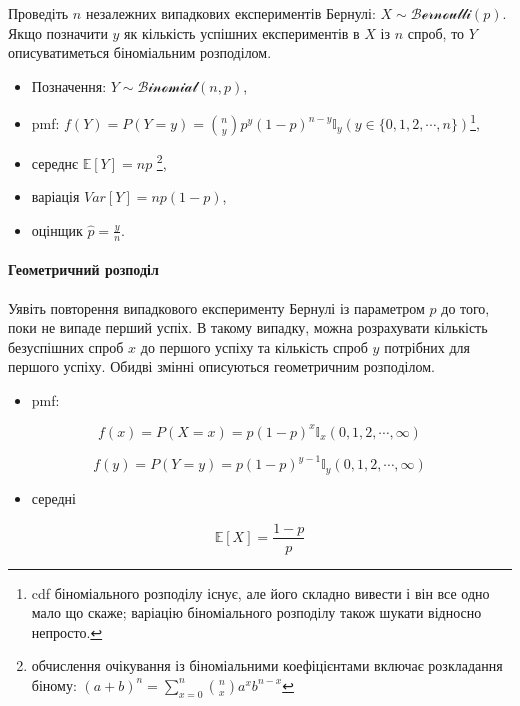 \documentclass[
  11pt,
]{book}
\providecommand{\tightlist}{%
  \setlength{\itemsep}{0pt}\setlength{\parskip}{0pt}}
\begin{document}
Проведіть \(n\) незалежних випадкових експериментів Бернулі: \(X \sim \mathcal{Bernoulli}(p)\). Якщо позначити \(y\) як кількість успішних експериментів в \(X\) із \(n\) спроб, то \(Y\) описуватиметься біноміальним розподілом.

\begin{itemize}
\item
  Позначення: \(Y \sim \mathcal{Binomial}(n, p)\),
\item
  pmf: \(f(Y) = P(Y = y) = \binom{n}{y} p^y (1-p)^{n - y} \mathbb{I}_y (y \in \{0, 1, 2, \cdots, n\})\)\footnote{cdf біноміального розподілу існує, але його складно вивести і він все одно мало що скаже; варіацію біноміального розподілу також шукати відносно непросто.},
\item
  середнє \(\mathbb{E} [Y] = np\) \footnote{обчислення очікування із біноміальними коефіцієнтами включає розкладання біному: \((a + b)^n = \sum \limits_{x = 0}^n \binom{n}{x} a^x b^{n - x}\)},
\item
  варіація \(Var[Y] = np(1-p)\),
\item
  оцінщик \(\hat{p} = \frac{y}{n}\).
\end{itemize}

\paragraph{Геометричний розподіл}\label{ux433ux435ux43eux43cux435ux442ux440ux438ux447ux43dux438ux439-ux440ux43eux437ux43fux43eux434ux456ux43b}

Уявіть повторення випадкового експерименту Бернулі із параметром \(p\) до того, поки не випаде перший успіх. В такому випадку, можна розрахувати кількість безуспішних спроб \(x\) до першого успіху та кількість спроб \(y\) потрібних для першого успіху. Обидві змінні описуються геометричним розподілом.

\begin{itemize}
\tightlist
\item
  pmf:
\end{itemize}

\[f(x) = P(X = x) = p(1 - p)^x \mathbb{I}_x (0, 1, 2, \cdots, \infty)\]

\[f(y) = P(Y = y) = p(1-p)^{y-1} \mathbb{I}_y (0, 1, 2, \cdots, \infty)\]

\begin{itemize}
\tightlist
\item
  середні
\end{itemize}

\[\mathbb{E} [X] = \frac{1-p}{p}\]
\end{document}

